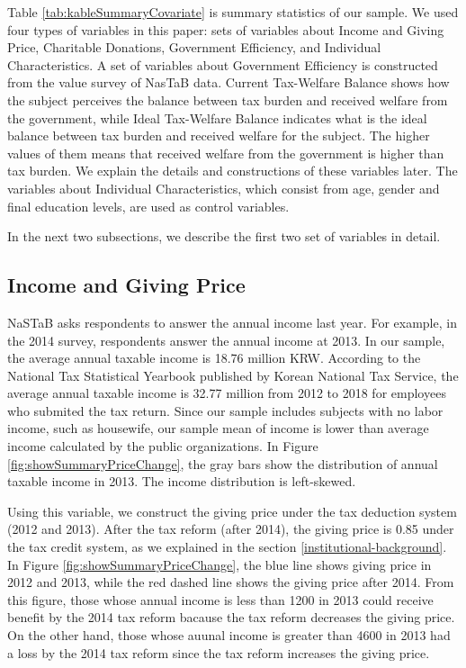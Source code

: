 \documentclass[ review  , 3p ]{elsarticle}
\begin{document}
  Table \ref{tab:kableSummaryCovariate} is summary statistics of our sample.
  We used four types of variables in this paper:
  sets of variables about Income and Giving Price,
  Charitable Donations,
  Government Efficiency,
  and Individual Characteristics.
  A set of variables about Government Efficiency is constructed from the value survey of NasTaB data.
  Current Tax-Welfare Balance shows how the subject perceives the balance between tax burden and received welfare from the government,
  while Ideal Tax-Welfare Balance indicates what is the ideal balance between tax burden and received welfare for the subject.
  The higher values of them means that received welfare from the government is higher than tax burden.
  We explain the details and constructions of these variables later.
  The variables about Individual Characteristics,
  which consist from age, gender and final education levels, are used as control variables.

  In the next two subsections,
  we describe the first two set of variables in detail.

  \hypertarget{income-and-giving-price}{%
  \subsection{Income and Giving Price}\label{income-and-giving-price}}

  NaSTaB asks respondents to answer the annual income last year.
  For example, in the 2014 survey, respondents answer the annual income at 2013.
  In our sample, the average annual taxable income is 18.76 million KRW.
  According to the National Tax Statistical Yearbook published by Korean National Tax Service,
  the average annual taxable income is 32.77 million from 2012 to 2018
  for employees who submited the tax return.
  Since our sample includes subjects with no labor income, such as housewife,
  our sample mean of income is lower than average income calculated by the public organizations.
  In Figure \ref{fig:showSummaryPriceChange},
  the gray bars show the distribution of annual taxable income in 2013.
  The income distribution is left-skewed.

  Using this variable, we construct the giving price under the tax deduction system (2012 and 2013).
  After the tax reform (after 2014), the giving price is 0.85 under the tax credit system,
  as we explained in the section \ref{institutional-background}.
  In Figure \ref{fig:showSummaryPriceChange},
  the blue line shows giving price in 2012 and 2013,
  while the red dashed line shows the giving price after 2014.
  From this figure,
  those whose annual income is less than 1200 in 2013 could receive benefit by the 2014 tax reform
  bacause the tax reform decreases the giving price.
  On the other hand,
  those whose auunal income is greater than 4600 in 2013 had a loss by the 2014 tax reform
  since the tax reform increases the giving price.
\end{document}

